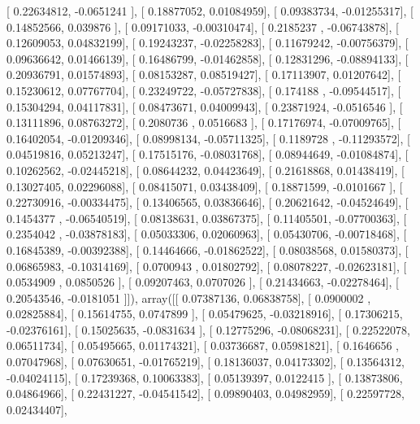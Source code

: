 \documentclass{article}
\begin{document}
       [ 0.22634812, -0.0651241 ],
       [ 0.18877052,  0.01084959],
       [ 0.09383734, -0.01255317],
       [ 0.14852566,  0.039876  ],
       [ 0.09171033, -0.00310474],
       [ 0.2185237 , -0.06743878],
       [ 0.12609053,  0.04832199],
       [ 0.19243237, -0.02258283],
       [ 0.11679242, -0.00756379],
       [ 0.09636642,  0.01466139],
       [ 0.16486799, -0.01462858],
       [ 0.12831296, -0.08894133],
       [ 0.20936791,  0.01574893],
       [ 0.08153287,  0.08519427],
       [ 0.17113907,  0.01207642],
       [ 0.15230612,  0.07767704],
       [ 0.23249722, -0.05727838],
       [ 0.174188  , -0.09544517],
       [ 0.15304294,  0.04117831],
       [ 0.08473671,  0.04009943],
       [ 0.23871924, -0.0516546 ],
       [ 0.13111896,  0.08763272],
       [ 0.2080736 ,  0.0516683 ],
       [ 0.17176974, -0.07009765],
       [ 0.16402054, -0.01209346],
       [ 0.08998134, -0.05711325],
       [ 0.1189728 , -0.11293572],
       [ 0.04519816,  0.05213247],
       [ 0.17515176, -0.08031768],
       [ 0.08944649, -0.01084874],
       [ 0.10262562, -0.02445218],
       [ 0.08644232,  0.04423649],
       [ 0.21618868,  0.01438419],
       [ 0.13027405,  0.02296088],
       [ 0.08415071,  0.03438409],
       [ 0.18871599, -0.0101667 ],
       [ 0.22730916, -0.00334475],
       [ 0.13406565,  0.03836646],
       [ 0.20621642, -0.04524649],
       [ 0.1454377 , -0.06540519],
       [ 0.08138631,  0.03867375],
       [ 0.11405501, -0.07700363],
       [ 0.2354042 , -0.03878183],
       [ 0.05033306,  0.02060963],
       [ 0.05430706, -0.00718468],
       [ 0.16845389, -0.00392388],
       [ 0.14464666, -0.01862522],
       [ 0.08038568,  0.01580373],
       [ 0.06865983, -0.10314169],
       [ 0.0700943 ,  0.01802792],
       [ 0.08078227, -0.02623181],
       [ 0.0534909 ,  0.0850526 ],
       [ 0.09207463,  0.0707026 ],
       [ 0.21434663, -0.02278464],
       [ 0.20543546, -0.0181051 ]]), array([[ 0.07387136,  0.06838758],
       [ 0.0900002 ,  0.02825884],
       [ 0.15614755,  0.0747899 ],
       [ 0.05479625, -0.03218916],
       [ 0.17306215, -0.02376161],
       [ 0.15025635, -0.0831634 ],
       [ 0.12775296, -0.08068231],
       [ 0.22522078,  0.06511734],
       [ 0.05495665,  0.01174321],
       [ 0.03736687,  0.05981821],
       [ 0.1646656 ,  0.07047968],
       [ 0.07630651, -0.01765219],
       [ 0.18136037,  0.04173302],
       [ 0.13564312, -0.04024115],
       [ 0.17239368,  0.10063383],
       [ 0.05139397,  0.0122415 ],
       [ 0.13873806,  0.04864966],
       [ 0.22431227, -0.04541542],
       [ 0.09890403,  0.04982959],
       [ 0.22597728,  0.02434407],
\end{document}
